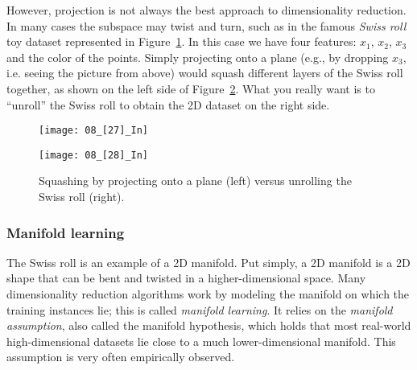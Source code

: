 However, projection is not always the best approach to dimensionality reduction. In many cases the subspace may twist and turn, such as in the famous \emph{Swiss roll} toy dataset represented in Figure~\ref{08_[27]_In}. In this case we have four features: $x_1$, $x_2$, $x_3$ and the color of the points. Simply projecting onto a plane (e.g., by dropping $x_3$, i.e. seeing the picture from above) would squash different layers of the Swiss roll together, as shown on the left side of Figure~\ref{08_[28]_In}. What you really want is to ``unroll'' the Swiss roll to obtain the 2D dataset on the right side.
\begin{figure}[h!t]
\centering
\texttt{[image: 08\_[27]\_In]}
\caption{}\label{08_[27]_In}
\end{figure}
\begin{figure}[h!t]
\centering
\texttt{[image: 08\_[28]\_In]}
\caption{Squashing by projecting onto a plane (left) versus unrolling the Swiss roll (right).}\label{08_[28]_In}
\end{figure}
\subsubsection{Manifold learning}
The Swiss roll is an example of a 2D manifold. Put simply, a 2D manifold is a 2D shape that can be bent and twisted in a higher-dimensional space. Many dimensionality reduction algorithms work by modeling the manifold on which the training instances lie; this is called \emph{manifold learning}. It relies on the \emph{manifold assumption}, also called the manifold hypothesis, which holds that most real-world high-dimensional datasets lie close to a much lower-dimensional manifold. This assumption is very often empirically observed.

